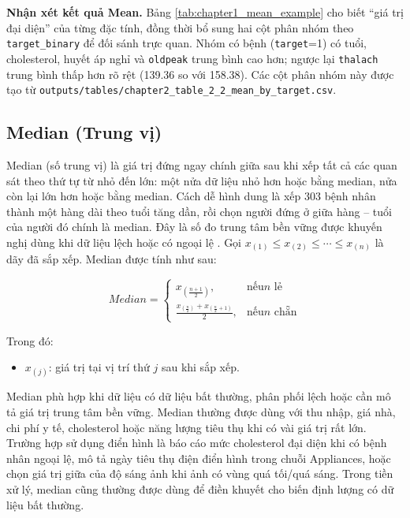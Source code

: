 \textbf{Nhận xét kết quả Mean.} Bảng \ref{tab:chapter1_mean_example} cho biết ``giá trị đại diện'' của từng đặc tính, đồng thời bổ sung hai cột phân nhóm theo \texttt{target\_binary} để đối sánh trực quan. Nhóm có bệnh (\texttt{target}=1) có tuổi, cholesterol, huyết áp nghỉ và \texttt{oldpeak} trung bình cao hơn; ngược lại \texttt{thalach} trung bình thấp hơn rõ rệt (139.36 so với 158.38). Các cột phân nhóm này được tạo từ \texttt{outputs/tables/chapter2\_table\_2\_2\_mean\_by\_target.csv}.

\subsection{Median (Trung vị)}

Median (số trung vị) là giá trị đứng ngay chính giữa sau khi xếp tất cả các quan sát theo thứ tự từ nhỏ đến lớn: một nửa dữ liệu nhỏ hơn hoặc bằng median, nửa còn lại lớn hơn hoặc bằng median. Cách dễ hình dung là xếp 303 bệnh nhân thành một hàng dài theo tuổi tăng dần, rồi chọn người đứng ở giữa hàng -- tuổi của người đó chính là median. Đây là số đo trung tâm bền vững được khuyến nghị dùng khi dữ liệu lệch hoặc có ngoại lệ \cite{Sahay2021Essentials,DeMauro2021DataAnalytics}. Gọi $x_{(1)} \le x_{(2)} \le \cdots \le x_{(n)}$ là dãy đã sắp xếp. Median được tính như sau:

\begin{equation}
Median =
\begin{cases}
 x_{\left(\frac{n+1}{2}\right)}, & \text{nếu} n \text{ lẻ} \\
 \frac{x_{\left(\frac{n}{2}\right)} + x_{\left(\frac{n}{2}+1\right)}}{2}, & \text{nếu} n \text{ chẵn}
\end{cases}
\end{equation}

Trong đó:
\begin{itemize}[leftmargin=1.6em,label=\textbullet]
 \item $x_{(j)}$: giá trị tại vị trí thứ $j$ sau khi sắp xếp.
\end{itemize}

Median phù hợp khi dữ liệu có dữ liệu bất thường, phân phối lệch hoặc cần mô tả giá trị trung tâm bền vững. Median thường được dùng với thu nhập, giá nhà, chi phí y tế, cholesterol hoặc năng lượng tiêu thụ khi có vài giá trị rất lớn. Trường hợp sử dụng điển hình là báo cáo mức cholesterol đại diện khi có bệnh nhân ngoại lệ, mô tả ngày tiêu thụ điện điển hình trong chuỗi Appliances, hoặc chọn giá trị giữa của độ sáng ảnh khi ảnh có vùng quá tối/quá sáng. Trong tiền xử lý, median cũng thường được dùng để điền khuyết cho biến định lượng có dữ liệu bất thường.

